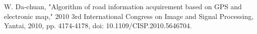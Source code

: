 \documentclass[10pt, conference, compsocconf]{IEEEtran}
\begin{document}
	
	
	
	\begin{thebibliography}{1}
		
		W. Da-chuan, "Algorithm of road information acquirement based on GPS and electronic map," 2010 3rd International Congress on Image and Signal Processing, Yantai, 2010, pp. 4174-4178, doi: 10.1109/CISP.2010.5646704.



		
	\end{thebibliography}
\end{document}
